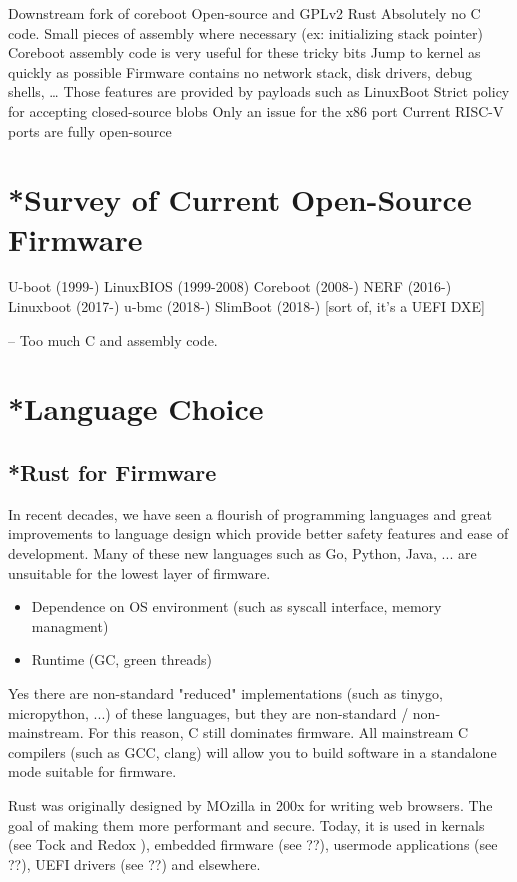 \documentclass[conference]{IEEEtran}
\begin{document}
Downstream fork of coreboot\cite{minnich2000linux}
Open-source and GPLv2
Rust
Absolutely no C code.
Small pieces of assembly where necessary (ex: initializing stack pointer)
Coreboot assembly code is very useful for these tricky bits
Jump to kernel as quickly as possible
Firmware contains no network stack, disk drivers, debug shells, …
Those features are provided by payloads such as LinuxBoot
Strict policy for accepting closed-source blobs
Only an issue for the x86 port
Current RISC-V ports are fully open-source


\section{*Survey of Current Open-Source Firmware}

U-boot (1999-)
LinuxBIOS (1999-2008)
Coreboot (2008-)
NERF (2016-)
Linuxboot (2017-)
u-bmc (2018-)
SlimBoot (2018-) [sort of, it’s a UEFI DXE]

-- Too much C and assembly code.

\section{*Language Choice}

\subsection{*Rust for Firmware}

In recent decades, we have seen a flourish of programming languages and great improvements to language design which provide better safety features and ease of development. Many of these new languages such as Go, Python, Java, ... are unsuitable for the lowest layer of firmware.

\begin{itemize}
    \item Dependence on OS environment (such as syscall interface, memory managment)
    \item Runtime (GC, green threads)
\end{itemize}

Yes there are non-standard "reduced" implementations (such as tinygo, micropython, ...) of these languages, but they are non-standard / non-mainstream. For this reason, C still dominates firmware. All mainstream C compilers (such as GCC, clang) will allow you to build software in a standalone mode suitable for firmware.

Rust was originally designed by MOzilla in 200x for writing web browsers. The goal of making them more performant and secure. Today, it is used in kernals (see Tock \cite{b1} and Redox \cite{b3}), embedded firmware (see ??), usermode applications (see ??), UEFI drivers (see ??) and elsewhere.
\end{document}
